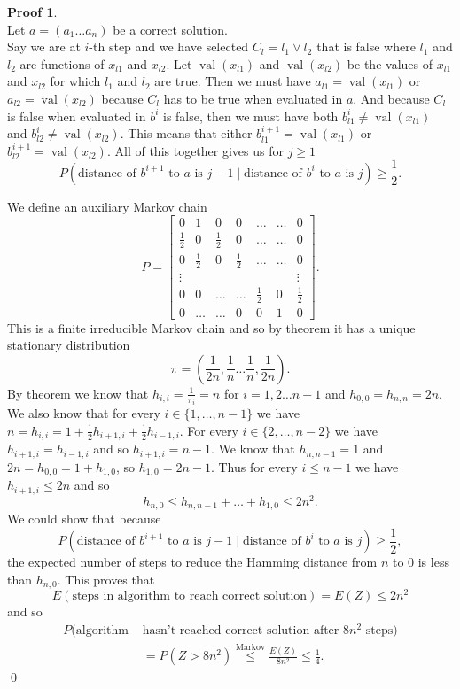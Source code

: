 \documentclass[a4paper, 12pt]{book}
\theoremstyle{definition}
\newtheorem{pro}[counter]{Proof}
\theoremstyle{remark}
\DeclareMathOperator{\val}{val}
\begin{document}
\begin{pro} \text{} \\
  Let $a = (a_1 \dots a_n)$ be a correct solution. \\
  Say we are at $i$-th step and we have selected $C_l = l_1 \vee l_2$ that is false where $l_1$ and $l_2$ are functions of $x_{l1}$ and $x_{l2}$. Let $\val(x_{l1})$ and $\val(x_{l2})$ be the values
  of $x_{l1}$ and $x_{l2}$ for which $l_1$ and $l_2$ are true. Then we must have $a_{l1} = \val(x_{l1})$ or $a_{l2} = \val(x_{l2})$
  because $C_l$ has to be true when evaluated in $a$. And because $C_l$ is false when evaluated in $b^i$ is false, then we must have both $b^i_{l1} \neq \val(x_{l1})$ and $b^i_{l2} \neq \val(x_{l2})$.
  This means that either $b^{i+1}_{l1} = \val(x_{l1})$ or $b^{i+1}_{l2} = \val(x_{l2})$. All of this together gives us for $ j \geq 1$
  $$P(\text{distance of } b^{i+1} \text{ to $a$ is } j-1 \mid \text{distance of $b^i$ to $a$ is } j) \geq \frac{1}{2}.$$

  We define an auxiliary Markov chain
  $$P = \begin{bmatrix}
    0 & 1 & 0 & 0 & \dots & \dots & 0 \\
    \frac{1}{2} & 0 & \frac{1}{2} & 0 & \dots & \dots & 0 \\
    0 & \frac{1}{2} & 0 & \frac{1}{2} & \dots & \dots & 0 \\
    \vdots & & & & & & \vdots \\
    0 & 0 & \dots & \dots & \frac{1}{2} & 0 & \frac{1}{2} \\
    0 & \dots & \dots & 0 & 0 & 1 & 0
  \end{bmatrix}.$$
  This is a finite irreducible Markov chain and so by theorem it has a unique stationary distribution
  $$\pi = (\frac{1}{2n}, \frac{1}{n} \dots \frac{1}{n}, \frac{1}{2n}).$$
  By theorem we know that $h_{i,i} = \frac{1}{\pi_i} = n$ for $i = 1, 2 \dots n-1$ and $h_{0,0} = h_{n,n} = 2n$. \\
  We also know that for every $i \in \{1, \ldots, n-1\}$ we have $n = h_{i,i} = 1 + \frac{1}{2} h_{i+1,i} + \frac{1}{2} h_{i-1,i}$. For every
  $i \in \{2, \ldots, n-2\}$ we have $h_{i+1,i} = h_{i-1,i}$ and so $h_{i+1,i} = n - 1$. We know that $h_{n, n - 1} = 1$ and $2n = h_{0,0} = 1 + h_{1,0}$,
  so $h_{1,0} = 2n - 1$. Thus for every $i \leq n - 1$ we have $h_{i+1,i} \leq 2n$ and so
  $$h_{n,0} \leq h_{n,n-1} + \dots + h_{1,0} \leq 2n^2.$$
  We could show that because
  $$P(\text{distance of } b^{i+1} \text{ to $a$ is } j-1 \mid \text{distance of $b^i$ to $a$ is } j) \geq \frac{1}{2},$$
  the expected number of steps to reduce the Hamming distance from $n$ to $0$ is less than $h_{n,0}$. This proves that
  $$E(\text{steps in algorithm to reach correct solution}) = E(Z) \leq 2n^2$$
  and so
  \begin{align*}
    P(\text{algorithm }&\text{hasn't reached correct solution after $8n^2$ steps}) \\&= P(Z > 8n^2) \stackrel{\text{Markov}}{\leq} \frac{E(Z)}{8n^2} \leq \frac{1}{4}.
  \end{align*}  
  \qed
\end{pro}
\end{document}
